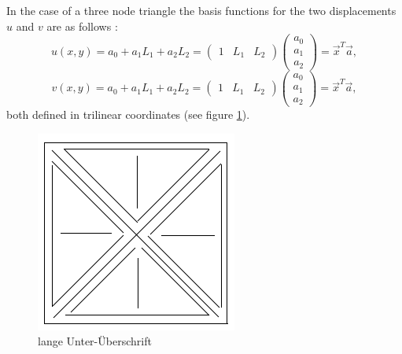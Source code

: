 \documentclass[11pt,twoside]{scrartcl}
\begin{document}
  In the case of a three node triangle the basis functions for the two displacements $u$ and $v$ are as follows \cite{steinke2005finite}:
  \begin{equation}\label{eq:t3_ansatzU}
  u(x,y) = a_0 + a_1L_1 + a_2L_2 = \begin{pmatrix}
  1 & L_1 & L_2
  \end{pmatrix} \begin{pmatrix}
  a_0 \\ a_1 \\ a_2
  \end{pmatrix} = \vec{x}^T \vec{a},
  \end{equation}
  \begin{equation}\label{eq:t3_ansatzV}
  v(x,y) = a_0 + a_1L_1 + a_2L_2 = \begin{pmatrix}
  1 & L_1 & L_2
  \end{pmatrix} \begin{pmatrix}
  a_0 \\ a_1 \\ a_2
  \end{pmatrix} = \vec{x}^T \vec{a},
  \end{equation}
  both defined in trilinear coordinates (see figure \ref{fig:platzhalter}).
  \begin{figure}
  	\centering
  	\includegraphics[width=0.7\linewidth]{figures/platzhalter}
  	\caption[kurze Unter-Überschrift]{lange Unter-Überschrift}
  	\label{fig:platzhalter}
  \end{figure}
\end{document}
